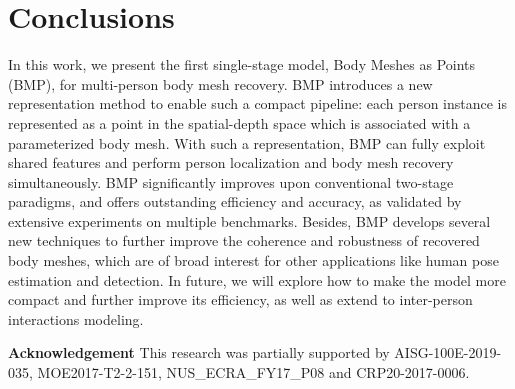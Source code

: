 \documentclass[final]{cvpr}
\newcommand{\myparagraph}[1]{{ \noindent \bf #1}}
\begin{document}
 \section{Conclusions}

In this work, we present the first single-stage model, Body Meshes as Points (BMP), for multi-person body mesh recovery. BMP introduces a new representation method to enable such a compact pipeline: each person instance is represented as a point in the spatial-depth space which is associated with a parameterized body mesh. With such a representation, BMP can fully exploit shared features and perform person localization and body mesh recovery simultaneously. BMP significantly improves upon conventional two-stage paradigms, and offers outstanding efficiency and accuracy, as validated by extensive experiments on multiple benchmarks. Besides, BMP develops several new techniques to further improve the coherence and robustness of recovered body meshes, which are of broad interest for other applications like human pose estimation and detection. In future, we will explore how to make the model more compact and further improve its efficiency, as well as extend to inter-person interactions modeling.

\myparagraph{Acknowledgement}
This research was partially supported by AISG-100E-2019-035, MOE2017-T2-2-151, NUS\_ECRA\_FY17\_P08 and CRP20-2017-0006. 


{\small


}
\end{document}
